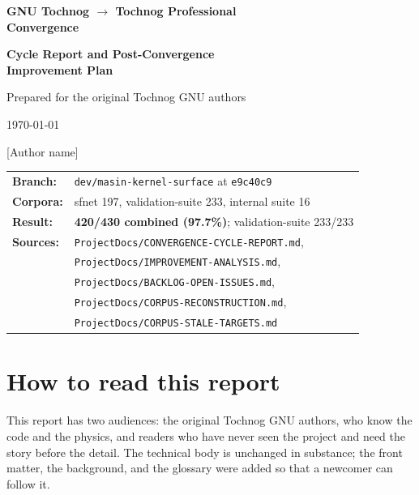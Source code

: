 \documentclass[11pt,a4paper]{report}
\newcommand{\code}[1]{\texttt{#1}}
\begin{document}
\begin{titlepage}
\centering
\vspace*{2.2cm}
{\Huge\bfseries GNU Tochnog $\rightarrow$ Tochnog Professional\\[0.3em]
Convergence\par}
\vspace{0.9cm}
{\Large\bfseries Cycle Report and Post-Convergence\\[0.2em] Improvement Plan\par}
\vspace{1.8cm}
{\large Prepared for the original Tochnog GNU authors\par}
\vspace{0.4cm}
{\large \today\par}
\vfill
{\large [Author name]\par}
\vspace{1.2cm}
{\small
\begin{tabular}{@{}ll@{}}
\textbf{Branch:}   & \code{dev/\allowbreak masin-kernel-surface} at \code{e9c40c9} \\[0.25em]
\textbf{Corpora:}  & sfnet 197, validation-suite 233, internal suite 16 \\[0.25em]
\textbf{Result:}   & \textbf{420/430 combined (97.7\%)}; validation-suite 233/233 \\[0.25em]
\textbf{Sources:}  & \code{ProjectDocs/\allowbreak CONVERGENCE-CYCLE-REPORT.md}, \\
                   & \code{ProjectDocs/\allowbreak IMPROVEMENT-ANALYSIS.md}, \\
                   & \code{ProjectDocs/\allowbreak BACKLOG-OPEN-ISSUES.md}, \\
                   & \code{ProjectDocs/\allowbreak CORPUS-RECONSTRUCTION.md}, \\
                   & \code{ProjectDocs/\allowbreak CORPUS-STALE-TARGETS.md} \\
\end{tabular}
}
\end{titlepage}

\chapter*{How to read this report}

This report has two audiences: the original Tochnog GNU authors, who know the
code and the physics, and readers who have never seen the project and need the
story before the detail. The technical body is unchanged in substance; the
front matter, the background, and the glossary were added so that a newcomer
can follow it.
\end{document}
